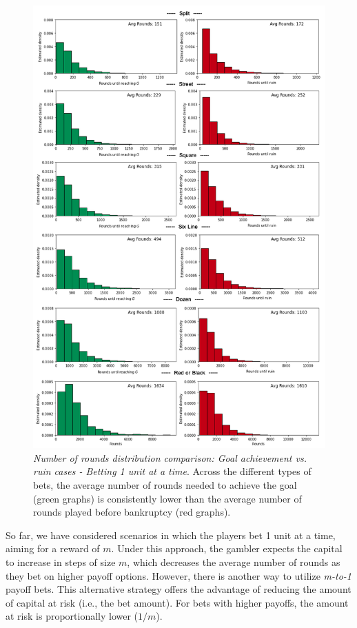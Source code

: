 \documentclass[11pt,twoside]{article}
\numberwithin{Theorem}{section}
\numberwithin{Definition}{section}
\numberwithin{Lemma}{section}
\numberwithin{Algorithm}{section}
\numberwithin{equation}{section}
\begin{document}
\begin{figure}[H]
        \centering
        \includegraphics[width=13cm]{cut_2.png}
        \caption[Number of rounds distribution comparison: Goal achievement vs. ruin cases - Betting 1 unit at a time.] {\textit{Number of rounds distribution comparison: Goal achievement vs. ruin cases - Betting 1 unit at a time}. Across the different types of bets, the average number of rounds needed to achieve the goal (green graphs) is consistently lower than the average number of rounds played before bankruptcy (red graphs).} \label{fig:hists_1}
\end{figure}

So far, we have considered scenarios in which the players bet 1 unit at a time, aiming for a reward of $m$. Under this approach, the gambler expects the capital to increase in steps of size $m$, which decreases the average number of rounds as they bet on higher payoff options. However, there is another way to utilize \textit{m-to-1} payoff bets. This alternative strategy offers the advantage of reducing the amount of capital at risk (i.e., the bet amount). For bets with higher payoffs, the amount at risk is proportionally lower ($1/m$).
\end{document}
